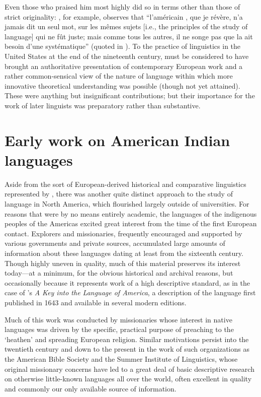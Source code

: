 Even those who praised him most highly did so in terms other than
those of strict originality: {\Saussure}, for example, observes that
``l'américain {\Whitney}, que je révère, n'a jamais dit un seul mot, sur
les mêmes sujets [i.e., the principles of the study of language] qui
ne fût juste; mais comme tous les autres, il ne songe pas que la
 ait besoin d'une systématique'' (quoted in
\citealt[51]{godel57:sources}). To the practice of linguistics in the
United States at the end of the nineteenth century, {\Whitney} must be
considered to have brought an authoritative presentation of
contemporary European work and a rather common-sensical view of the
nature of language within which more innovative theoretical
understanding was possible (though not yet attained). These were
anything but insignificant contributions; but their importance for the
work of later linguists was preparatory rather than substantive.

\section{Early work on American Indian languages}

Aside from the sort of European-derived historical and comparative
linguistics represented by {\Whitney}, there was another quite distinct
approach to the study of language in North America, which flourished
largely outside of universities. For reasons that were by no means
entirely academic, the languages of the indigenous peoples of the
Americas excited great interest from the time of the first European
contact. Explorers and missionaries, frequently encouraged and
supported by various governments and private sources, accumulated
large amounts of information about these languages dating at least
from the sixteenth century. Though highly uneven in quality, much of
this material preserves its interest today—at a minimum, for the
obvious historical and archival reasons, but occasionally because it
represents work of a high descriptive standard, as in the case of
's \textsl{A Key into the Language of America}, a
description of the  language  first published in
1643 and available in several modern editions.

Much of this work was conducted by missionaries whose interest in native
languages was driven by the specific, practical purpose of preaching to the
`heathen' and spreading European religion. Similar motivations persist
into the twentieth century and down to the present in the work of such
organizations as the American Bible Society and the Summer Institute
of Linguistics, whose original missionary concerns have led to a great
deal of basic descriptive research on otherwise little-known languages
all over the world, often excellent in quality and commonly our only
available source of information.

